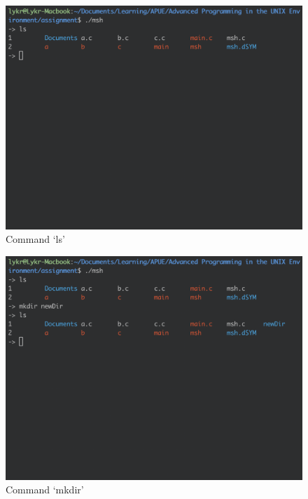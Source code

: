 \documentclass{article}
\begin{document}
\begin{figure}[h]
\centering
\includegraphics[scale=0.4]{fig/v5-2.png}
\caption{Command `ls'}
\end{figure}

\newpage
\begin{figure}[h]
\centering
\includegraphics[scale=0.4]{fig/v5-3.png}
\caption{Command `mkdir'}
\end{figure}
\end{document}
